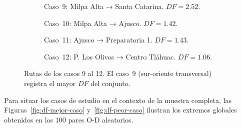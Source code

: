 \begin{figure}[H]
    \centering
    \begin{subfigure}[t]{0.48\textwidth}
        \caption{Caso~9: Milpa Alta → Santa Catarina. $DF = 2.52$.}
        \label{fig:df-c09}
    \end{subfigure}
    \hfill
    \begin{subfigure}[t]{0.48\textwidth}
        \caption{Caso~10: Milpa Alta → Ajusco. $DF = 1.42$.}
        \label{fig:df-c10}
    \end{subfigure}

    \vspace{0.5em}
    \begin{subfigure}[t]{0.48\textwidth}
        \caption{Caso~11: Ajusco → Preparatoria 1. $DF = 1.43$.}
        \label{fig:df-c11}
    \end{subfigure}
    \hfill
    \begin{subfigure}[t]{0.48\textwidth}
        \caption{Caso~12: P. Los Olivos → Centro Tláhuac. $DF = 1.06$.}
        \label{fig:df-c12}
    \end{subfigure}
    \caption[Casos de estudio del Factor de Desviación: 9–12]{Rutas de los casos 9 al 12.
    El caso~9 (sur-oriente transversal) registra el mayor $DF$ del conjunto.}
    \label{fig:df-casos-9-12}
\end{figure}

Para situar los casos de estudio en el contexto de la muestra completa, las
Figuras~\ref{fig:df-mejor-caso} y~\ref{fig:df-peor-caso} ilustran los extremos
globales obtenidos en los 100 pares O-D aleatorios.

